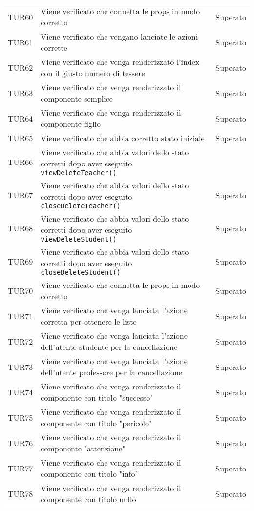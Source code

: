 \documentclass[PianoDiQualifica.tex]{subfiles}
\begin{document}
\begin{longtable}[H]{P{2cm}P{8.5cm}P{3cm}}
	TUR60 & Viene verificato che connetta le props in modo corretto & Superato \\ 
	TUR61 & Viene verificato che vengano lanciate le azioni corrette & Superato \\ 
	TUR62 & Viene verificato che venga renderizzato l'index con il giusto numero di tessere & Superato \\ 
	TUR63 & Viene verificato che venga renderizzato il componente semplice & Superato \\ 
	TUR64 & Viene verificato che venga renderizzato il componente figlio & Superato \\ 
	TUR65 & Viene verificato che abbia corretto stato iniziale & Superato \\ 
	TUR66 & Viene verificato che abbia valori dello stato corretti dopo aver eseguito \texttt{viewDeleteTeacher()} \\ 
	TUR67 & Viene verificato che abbia valori dello stato corretti dopo aver eseguito \texttt{closeDeleteTeacher()} & Superato \\ 
	TUR68 & Viene verificato che abbia valori dello stato corretti dopo aver eseguito \texttt{viewDeleteStudent()} & Superato \\ 
	TUR69 & Viene verificato che abbia valori dello stato corretti dopo aver eseguito \texttt{closeDeleteStudent()} & Superato \\ 
	TUR70 & Viene verificato che connetta le props in modo corretto & Superato \\ 
	TUR71 & Viene verificato che venga lanciata l'azione corretta per ottenere le liste & Superato \\ 
	TUR72 & Viene verificato che venga lanciata l'azione dell'utente studente per la cancellazione & Superato \\ 
	TUR73 & Viene verificato che venga lanciata l'azione dell'utente professore per la cancellazione & Superato \\ 
	TUR74 & Viene verificato che venga renderizzato il componente con titolo "successo" & Superato \\ 
	TUR75 & Viene verificato che venga renderizzato il componente con titolo "pericolo" & Superato \\ 
	TUR76 & Viene verificato che venga renderizzato il componente "attenzione"  & Superato \\ 
	TUR77 & Viene verificato che venga renderizzato il componente con titolo "info"  & Superato \\ 
	TUR78 & Viene verificato che venga renderizzato il componente con titolo nullo & Superato \\ 

\end{longtable}
\end{document}
